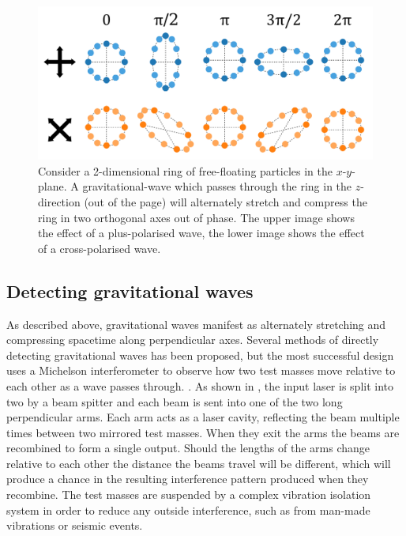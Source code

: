\begin{colsection}
\begin{colsection}
\begin{figure}[t]
    \begin{center}
        \includegraphics[width=0.8\linewidth]{images/waveimg2.pdf}
    \end{center}
    \caption[Gravitational-wave polarisations]{
        Consider a 2-dimensional ring of free-floating particles in the $x$-$y$-plane. A gravitational-wave which passes through the ring in the $z$-direction (out of the page) will alternately stretch and compress the ring in two orthogonal axes out of phase. The upper image shows the effect of a plus-polarised wave, the lower image shows the effect of a cross-polarised wave.
        }\label{fig:wave}
\end{figure}

\end{colsection}

\newpage
\subsection{Detecting gravitational waves}
\label{sec:gw_detecting}
\begin{colsection}

As described above, gravitational waves manifest as alternately stretching and compressing spacetime along perpendicular axes. Several methods of directly detecting gravitational waves has been proposed, but the most successful design uses a Michelson interferometer to observe how two test masses move relative to each other as a wave passes through. \citep{BIGbirmingham}. As shown in , the input laser is split into two by a beam spitter and each beam is sent into one of the two long perpendicular arms. Each arm acts as a laser cavity, reflecting the beam multiple times between two mirrored test masses. When they exit the arms the beams are recombined to form a single output. Should the lengths of the arms change relative to each other the distance the beams travel will be different, which will produce a chance in the resulting interference pattern produced when they recombine. The test masses are suspended by a complex vibration isolation system in order to reduce any outside interference, such as from man-made vibrations or seismic events.


\end{colsection}
\end{colsection}
